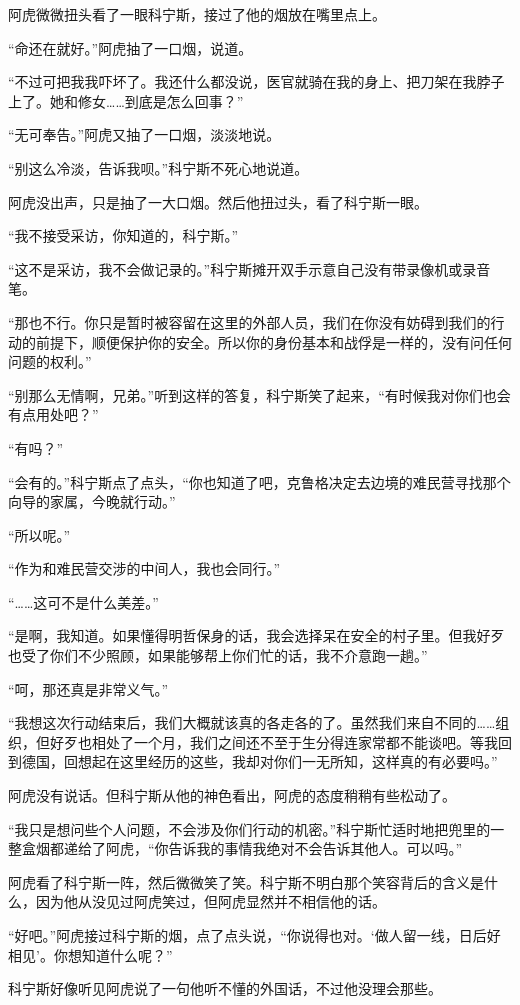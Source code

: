 阿虎微微扭头看了一眼科宁斯，接过了他的烟放在嘴里点上。

“命还在就好。”阿虎抽了一口烟，说道。

“不过可把我我吓坏了。我还什么都没说，医官就骑在我的身上、把刀架在我脖子上了。她和修女……到底是怎么回事？”

“无可奉告。”阿虎又抽了一口烟，淡淡地说。

“别这么冷淡，告诉我呗。”科宁斯不死心地说道。

阿虎没出声，只是抽了一大口烟。然后他扭过头，看了科宁斯一眼。

“我不接受采访，你知道的，科宁斯。”

“这不是采访，我不会做记录的。”科宁斯摊开双手示意自己没有带录像机或录音笔。

“那也不行。你只是暂时被容留在这里的外部人员，我们在你没有妨碍到我们的行动的前提下，顺便保护你的安全。所以你的身份基本和战俘是一样的，没有问任何问题的权利。”

“别那么无情啊，兄弟。”听到这样的答复，科宁斯笑了起来，“有时候我对你们也会有点用处吧？”

“有吗？”

“会有的。”科宁斯点了点头，“你也知道了吧，克鲁格决定去边境的难民营寻找那个向导的家属，今晚就行动。”

“所以呢。”

“作为和难民营交涉的中间人，我也会同行。”

“……这可不是什么美差。”

“是啊，我知道。如果懂得明哲保身的话，我会选择呆在安全的村子里。但我好歹也受了你们不少照顾，如果能够帮上你们忙的话，我不介意跑一趟。”

“呵，那还真是非常义气。”

“我想这次行动结束后，我们大概就该真的各走各的了。虽然我们来自不同的……组织，但好歹也相处了一个月，我们之间还不至于生分得连家常都不能谈吧。等我回到德国，回想起在这里经历的这些，我却对你们一无所知，这样真的有必要吗。”

阿虎没有说话。但科宁斯从他的神色看出，阿虎的态度稍稍有些松动了。

“我只是想问些个人问题，不会涉及你们行动的机密。”科宁斯忙适时地把兜里的一整盒烟都递给了阿虎，“你告诉我的事情我绝对不会告诉其他人。可以吗。”

阿虎看了科宁斯一阵，然后微微笑了笑。科宁斯不明白那个笑容背后的含义是什么，因为他从没见过阿虎笑过，但阿虎显然并不相信他的话。

“好吧。”阿虎接过科宁斯的烟，点了点头说，“你说得也对。‘做人留一线，日后好相见’。你想知道什么呢？”

科宁斯好像听见阿虎说了一句他听不懂的外国话，不过他没理会那些。

